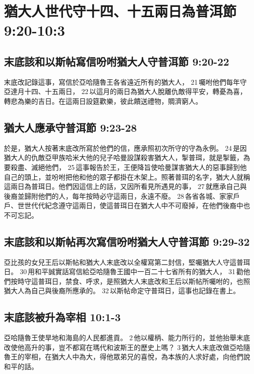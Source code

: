 \section{猶大人世代守十四、十五兩日為普洱節 9:20-10:3}
\subsection{末底該和以斯帖寫信吩咐猶大人守普洱節 9:20-22}
末底改記錄這事，寫信於亞哈隨魯王各省遠近所有的猶大人， 21 囑咐他們每年守亞達月十四、十五兩日， 22 以這月的兩日為猶大人脫離仇敵得平安，轉憂為喜，轉悲為樂的吉日。在這兩日設筵歡樂，彼此饋送禮物，賙濟窮人。

\subsection{猶大人應承守普洱節 9:23-28}
於是，猶大人按著末底改所寫於他們的信，應承照初次所守的守為永例。 24 是因猶大人的仇敵亞甲族哈米大他的兒子哈曼設謀殺害猶大人，掣普珥，就是掣籤，為要殺盡、滅絕他們， 25 這事報告於王，王便降旨使哈曼謀害猶大人的惡事歸到他自己的頭上，並吩咐把他和他的眾子都掛在木架上。照著普珥的名字，猶大人就稱這兩日為普珥日。他們因這信上的話，又因所看見所遇見的事， 27 就應承自己與後裔並歸附他們的人，每年按時必守這兩日，永遠不廢。 28 各省各城、家家戶戶、世世代代紀念遵守這兩日，使這普珥日在猶大人中不可廢掉，在他們後裔中也不可忘記。

\subsection{末底該和以斯帖再次寫信吩咐猶大人守普洱節 9:29-32}
亞比孩的女兒王后以斯帖和猶大人末底改以全權寫第二封信，堅囑猶大人守這普珥日。 30 用和平誠實話寫信給亞哈隨魯王國中一百二十七省所有的猶大人， 31 勸他們按時守這普珥日，禁食、呼求，是照猶大人末底改和王后以斯帖所囑咐的，也照猶大人為自己與後裔所應承的。 32 以斯帖命定守普珥日，這事也記錄在書上。

\subsection{末底該被升為宰相 10:1-3}
亞哈隨魯王使旱地和海島的人民都進貢。 2 他以權柄、能力所行的，並他抬舉末底改使他高升的事，豈不都寫在瑪代和波斯王的歷史上嗎？ 3 猶大人末底改做亞哈隨魯王的宰相，在猶大人中為大，得他眾弟兄的喜悅，為本族的人求好處，向他們說和平的話。










